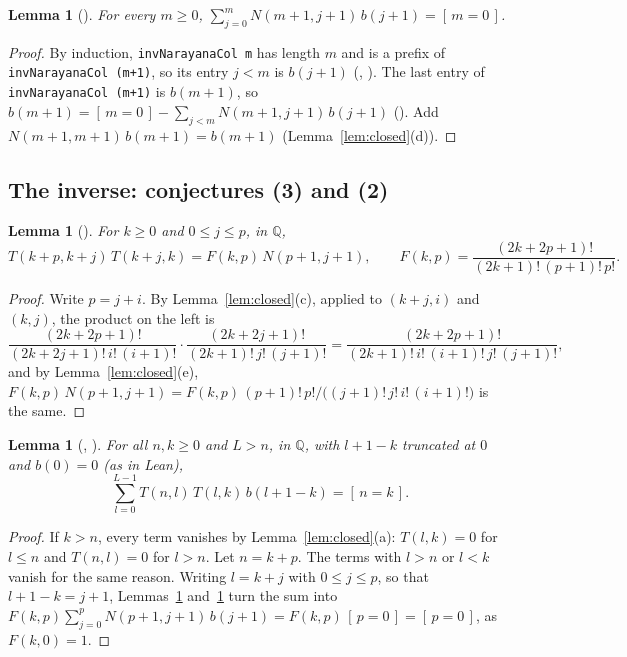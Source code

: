 \documentclass[11pt]{amsart}
\theoremstyle{plain}
\newtheorem{lemma}[theorem]{Lemma}
\theoremstyle{definition}
\newcommand{\Q}{\mathbb{Q}}
\newcommand{\ib}[1]{[\,#1\,]}
\begin{document}
\begin{lemma}[]\label{lem:b}
For every $m\ge0$, $\sum_{j=0}^{m}N(m+1,j+1)\,b(j+1)=\ib{m=0}$.
\end{lemma}

\begin{proof}
By induction, \texttt{invNarayanaCol m} has length $m$ and is a prefix of \texttt{invNarayanaCol (m+1)}, so its entry $j<m$ is $b(j+1)$ (, ). The last entry of \texttt{invNarayanaCol (m+1)} is $b(m+1)$, so $b(m+1)=\ib{m=0}-\sum_{j<m}N(m+1,j+1)\,b(j+1)$ (). Add $N(m+1,m+1)\,b(m+1)=b(m+1)$ (Lemma~\ref{lem:closed}(d)).
\end{proof}

\subsection{The inverse: conjectures (3) and (2)}

\begin{lemma}[]\label{lem:factor}
For $k\ge0$ and $0\le j\le p$, in $\Q$,
\[
  T(k+p,k+j)\,T(k+j,k)=F(k,p)\,N(p+1,j+1),\qquad F(k,p)=\frac{(2k+2p+1)!}{(2k+1)!\,(p+1)!\,p!}.
\]
\end{lemma}

\begin{proof}
Write $p=j+i$. By Lemma~\ref{lem:closed}(c), applied to $(k+j,i)$ and $(k,j)$, the product on the left is
\[
  \frac{(2k+2p+1)!}{(2k+2j+1)!\,i!\,(i+1)!}\cdot\frac{(2k+2j+1)!}{(2k+1)!\,j!\,(j+1)!}=\frac{(2k+2p+1)!}{(2k+1)!\,i!\,(i+1)!\,j!\,(j+1)!},
\]
and by Lemma~\ref{lem:closed}(e), $F(k,p)\,N(p+1,j+1)=F(k,p)\,(p+1)!\,p!/\bigl((j+1)!\,j!\,i!\,(i+1)!\bigr)$ is the same.
\end{proof}

\begin{lemma}[, ]\label{lem:TU}
For all $n,k\ge0$ and $L>n$, in $\Q$, with $l+1-k$ truncated at $0$ and $b(0)=0$ (as in Lean),
\[
  \sum_{l=0}^{L-1}T(n,l)\,T(l,k)\,b(l+1-k)=\ib{n=k}.
\]
\end{lemma}

\begin{proof}
If $k>n$, every term vanishes by Lemma~\ref{lem:closed}(a): $T(l,k)=0$ for $l\le n$ and $T(n,l)=0$ for $l>n$. Let $n=k+p$. The terms with $l>n$ or $l<k$ vanish for the same reason. Writing $l=k+j$ with $0\le j\le p$, so that $l+1-k=j+1$, Lemmas~\ref{lem:factor} and~\ref{lem:b} turn the sum into $F(k,p)\sum_{j=0}^{p}N(p+1,j+1)\,b(j+1)=F(k,p)\,\ib{p=0}=\ib{p=0}$, as $F(k,0)=1$.
\end{proof}
\end{document}
